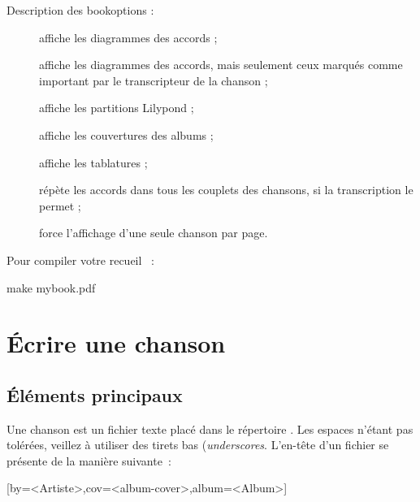 Description des \og bookoptions \fg{} :
\begin{description}
  \item[] affiche les diagrammes des accords ;
  \item[] affiche les diagrammes des
    accords, mais seulement ceux marqués comme important par le
    transcripteur de la chanson ;
  \item[] affiche les partitions Lilypond ;
  \item[] affiche les couvertures des albums ;
  \item[] affiche les tablatures ;
  \item[] répète les accords dans tous les
    couplets des chansons, si la transcription le permet ;
  \item[] force l'affichage d'une seule
    chanson par page.
\end{description}

Pour compiler votre recueil ~:
\begin{unix}
make mybook.pdf
\end{unix}


\section{Écrire une chanson}
\label{sec:write-song}

\subsection{Éléments principaux}

Une chanson est un fichier texte  placé dans
le répertoire . Les espaces n'étant pas
tolérées, veillez à utiliser des tirets bas (\emph{underscores}.
L'en-tête d'un fichier
 se présente de la manière suivante~:

\begin{songbook}
  [by=<Artiste>,cov=<album-cover>,album=<Album>]
\end{songbook}

